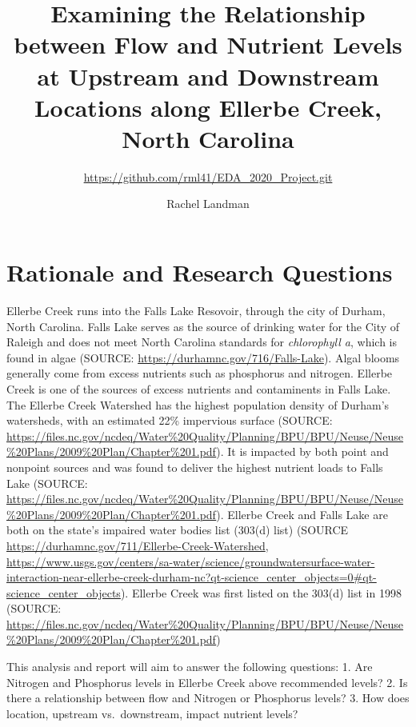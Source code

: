 \documentclass[12pt,]{article}
\title{Examining the Relationship between Flow and Nutrient Levels at Upstream
and Downstream Locations along Ellerbe Creek, North Carolina}
\subtitle{\url{https://github.com/rml41/EDA_2020_Project.git}}
\author{Rachel Landman}
\date{}
\begin{document}
\maketitle

\newpage
\tableofcontents 
\newpage
\listoftables 
\newpage
\listoffigures 
\newpage

\hypertarget{rationale-and-research-questions}{%
\section{Rationale and Research
Questions}\label{rationale-and-research-questions}}

Ellerbe Creek runs into the Falls Lake Resovoir, through the city of
Durham, North Carolina. Falls Lake serves as the source of drinking
water for the City of Raleigh and does not meet North Carolina standards
for \emph{chlorophyll a}, which is found in algae (SOURCE:
\url{https://durhamnc.gov/716/Falls-Lake}). Algal blooms generally come
from excess nutrients such as phosphorus and nitrogen. Ellerbe Creek is
one of the sources of excess nutrients and contaminents in Falls Lake.
The Ellerbe Creek Watershed has the highest population density of
Durham's watersheds, with an estimated 22\% impervious surface (SOURCE:
\url{https://files.nc.gov/ncdeq/Water\%20Quality/Planning/BPU/BPU/Neuse/Neuse\%20Plans/2009\%20Plan/Chapter\%201.pdf}).
It is impacted by both point and nonpoint sources and was found to
deliver the highest nutrient loads to Falls Lake (SOURCE:
\url{https://files.nc.gov/ncdeq/Water\%20Quality/Planning/BPU/BPU/Neuse/Neuse\%20Plans/2009\%20Plan/Chapter\%201.pdf}).
Ellerbe Creek and Falls Lake are both on the state's impaired water
bodies list (303(d) list) (SOURCE
\url{https://durhamnc.gov/711/Ellerbe-Creek-Watershed},
\url{https://www.usgs.gov/centers/sa-water/science/groundwatersurface-water-interaction-near-ellerbe-creek-durham-nc?qt-science_center_objects=0\#qt-science_center_objects}).
Ellerbe Creek was first listed on the 303(d) list in 1998 (SOURCE:
\url{https://files.nc.gov/ncdeq/Water\%20Quality/Planning/BPU/BPU/Neuse/Neuse\%20Plans/2009\%20Plan/Chapter\%201.pdf})

This analysis and report will aim to answer the following questions: 1.
Are Nitrogen and Phosphorus levels in Ellerbe Creek above recommended
levels? 2. Is there a relationship between flow and Nitrogen or
Phosphorus levels? 3. How does location, upstream vs.~downstream, impact
nutrient levels?

\newpage
\end{document}
